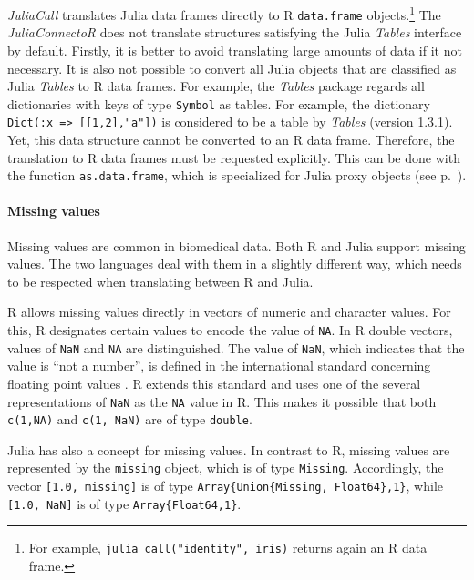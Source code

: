 \documentclass[12pt]{article}
\newcommand{\inlinecode}[1]{\texttt{#1}}
\newcommand{\apkg}[1]{\emph{#1}}
\begin{document}
\apkg{JuliaCall} translates Julia data frames directly to R \inlinecode{data.frame} objects.\footnote{For example, \inlinecode{julia\_call("identity", iris)} returns again an R data frame.}
The \apkg{JuliaConnectoR} does not translate structures satisfying the Julia \apkg{Tables} interface by default.
Firstly, it is better to avoid translating large amounts of data if it not necessary.
It is also not possible to convert all Julia objects that are classified as Julia \apkg{Tables} to R data frames.
For example, the \apkg{Tables} package regards all dictionaries with keys of type \inlinecode{Symbol} as tables.
For example, the dictionary \inlinecode{Dict(:x => [[1,2],"a"])} is considered to be a table by \apkg{Tables} (version 1.3.1).
Yet, this data structure cannot be converted to an R data frame.
Therefore, the translation to R data frames must be requested explicitly.
This can be done with the function \inlinecode{as.data.frame}, which is specialized for Julia proxy objects (see p.~\pageref{rdokitem_as.data.frame.JuliaProxy}).


\paragraph{Missing values}\label{juliaconnectorMissings}

Missing values are common in biomedical data. Both R and Julia support missing values.
The two languages deal with them in a slightly different way, which needs to be respected when translating between R and Julia.

R allows missing values directly in vectors of numeric and character values.
For this, R designates certain values to encode the value of \inlinecode{NA}.
In R double vectors, values of \inlinecode{NaN} and \inlinecode{NA} are distinguished.
The value of \inlinecode{NaN}, which indicates that the value is ``not a number'', is defined in the international standard concerning floating point values \citep{floatingpointstandard}.
R extends this standard and uses one of the several representations of \inlinecode{NaN} as the \inlinecode{NA} value in R.
This makes it possible that both \inlinecode{c(1,NA)} and \inlinecode{c(1, NaN)} are of type \inlinecode{double}.

Julia has also a concept for missing values.
In contrast to R, missing values are represented by the \inlinecode{missing} object, which is of type \inlinecode{Missing}. Accordingly, the vector \inlinecode{[1.0, missing]} is of type \inlinecode{Array\{Union\{Missing, Float64\},1\}}, while \inlinecode{[1.0, NaN]} is of type \inlinecode{Array\{Float64,1\}}.
\end{document}
